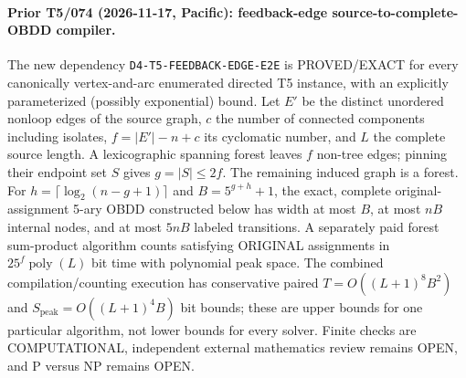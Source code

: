 \documentclass[11pt]{article}
\begin{document}
\paragraph{Prior T5/074 (2026-11-17, Pacific): feedback-edge source-to-complete-OBDD compiler.}
The new dependency \texttt{D4-T5-FEEDBACK-EDGE-E2E} is
PROVED/EXACT for every canonically vertex-and-arc enumerated directed T5
instance, with an explicitly parameterized (possibly exponential) bound.
Let $E'$ be the distinct unordered nonloop edges of the source graph,
$c$ the number of connected components including isolates,
$f=|E'|-n+c$ its cyclomatic number, and $L$ the complete source length.
A lexicographic spanning forest leaves $f$ non-tree edges; pinning
their endpoint set $S$ gives $g=|S|\le 2f$. The remaining induced
graph is a forest. For $h=\lceil\log_2(n-g+1)\rceil$ and
$B=5^{g+h}+1$, the exact, complete original-assignment 5-ary OBDD
constructed below has width at most $B$, at most $nB$ internal nodes,
and at most $5nB$ labeled transitions. A separately paid forest
sum-product algorithm counts satisfying ORIGINAL assignments in
$25^f\operatorname{poly}(L)$ bit time with polynomial peak space.
The combined compilation/counting execution has conservative paired
$T=O((L+1)^8B^2)$ and $S_{\mathrm{peak}}=O((L+1)^4B)$ bit bounds;
these are upper bounds for one particular algorithm, not lower bounds
for every solver. Finite checks are COMPUTATIONAL, independent external
mathematics review remains OPEN, and P versus NP remains OPEN.
\end{document}
